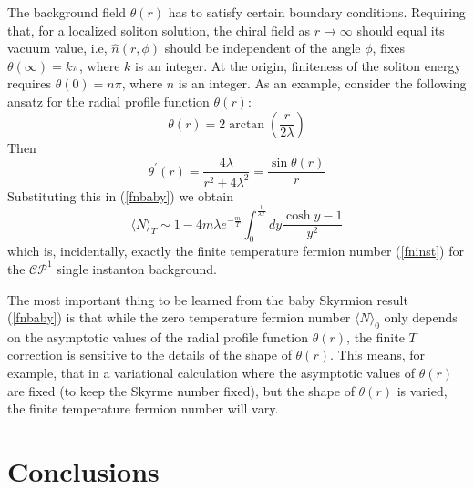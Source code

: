 \documentclass[a4paper,prd]{revtex4}
\begin{document}
The background field $\theta (r)$ has to satisfy certain boundary
conditions. Requiring that, for a localized soliton solution, the chiral
field as $r \to \infty$ should equal its vacuum value, i.e, $\hat{n}(r,\phi)$ should be independent of the angle $\phi$, fixes
$\theta(\infty)=k \pi$, where $k$ is an integer. At the origin,
finiteness of the soliton energy requires $\theta(0)=n \pi$, where $n$ is
an integer. As an example, consider the
following ansatz for the radial profile function
$\theta(r)$:
\begin{equation}
\theta(r)=2\arctan \left(\frac{r}{2 \lambda}\right)
\label{ansatz}
\end{equation}
Then 
\begin{equation}
\theta^{\prime}(r)=\frac{4 \lambda}{r^{2} +4
\lambda^{2}}=\frac{\sin \theta(r)}{r}
\end{equation} 
Substituting this in (\ref{fnbaby}) we obtain
\begin{equation}
\langle N \rangle _{T} \sim 1 - 
4 m \lambda e^{-\frac{m}{T}} \int_{0}^{\frac{1}{\lambda T}}dy 
\frac{\cosh y -1}{y^{2}}
\end{equation}
which is, incidentally, exactly the finite temperature fermion number
(\ref{fninst}) for the $\mathcal{CP}^1$ single instanton background.

The most important thing to be learned from the baby Skyrmion result
(\ref{fnbaby}) is that while the zero temperature fermion number $\langle
N\rangle_0$ only depends on the asymptotic values of the radial profile
function $\theta(r)$, the finite $T$ correction is sensitive to the
details of the shape of $\theta(r)$. This means, for example, that in a
variational calculation where the asymptotic values of $\theta(r)$ are
fixed (to keep the Skyrme number fixed), but the shape of $\theta(r)$ is
varied, the finite temperature fermion number will vary.





\section{Conclusions}
\end{document}
